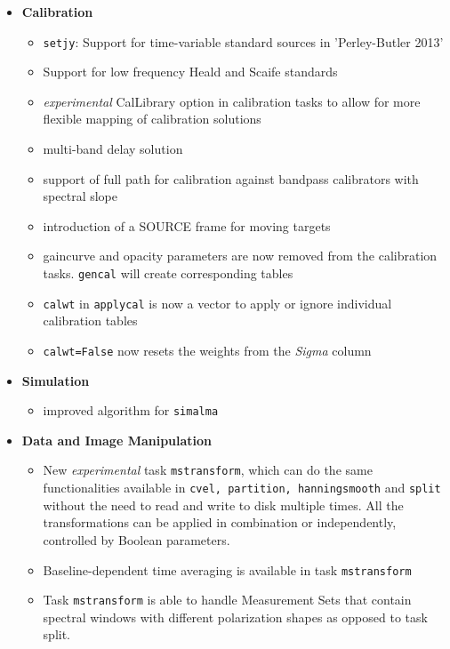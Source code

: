 \begin{itemize}
\item  {\bf Calibration}

\begin{itemize} 
    \item  {\tt setjy}: Support for time-variable standard sources in 'Perley-Butler 2013'
    \item  Support for low frequency Heald and Scaife standards
    \item  {\it experimental} CalLibrary option in calibration tasks to allow for more flexible mapping of calibration solutions 
    \item  multi-band delay solution
    \item  support of full path for calibration against bandpass calibrators with spectral slope
    \item  introduction of a SOURCE frame for moving targets
    \item  gaincurve and opacity parameters are now removed from the calibration tasks. {\tt gencal} will create corresponding tables
    \item  {\tt calwt} in {\tt applycal} is now a vector to apply or
      ignore individual calibration tables 
     \item {\tt calwt=False} now resets the weights from the {\it
         Sigma} column
\end{itemize} 

\item  {\bf Simulation}
\begin{itemize} 
   \item  improved algorithm for {\tt simalma}  
\end{itemize} 


\item  {\bf Data and Image Manipulation} 
\begin{itemize} 
   \item New {\it experimental} task {\tt mstransform}, which can do the same functionalities available
in {\tt cvel, partition, hanningsmooth} and {\tt split} without the need to read and write to
disk multiple times. All the transformations can be applied in combination or independently,
controlled by Boolean parameters.

   \item  Baseline-dependent time averaging is available in task {\tt mstransform}

   \item  Task {\tt mstransform} is able to handle Measurement Sets that contain spectral windows with
different polarization shapes as opposed to task split.


\end{itemize}
\end{itemize}
